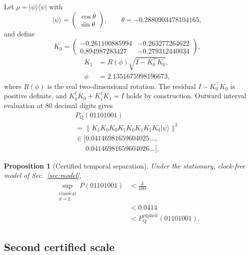 \documentclass[a4paper,twocolumn,11pt,unpublished]{quantumarticle}
\newtheorem{proposition}[theorem]{Proposition}
\begin{document}
Let $\rho=|\psi\rangle\langle\psi|$ with
\begin{equation}
|\psi\rangle=
\begin{pmatrix}\cos\theta\\ \sin\theta\end{pmatrix},
\qquad \theta=-0.2880903478104165,
\end{equation}
and define
\begin{equation}
K_0=
\begin{pmatrix}
-0.261100885994&-0.263277264622\\
 0.894987283427&-0.279312440034
\end{pmatrix},
\end{equation}
\begin{equation}
\begin{aligned}
K_1&=R(\phi)\sqrt{I-K_0^\top K_0},\\
\phi&=2.1351675998196673,
\end{aligned}
\end{equation}
where $R(\phi)$ is the real two-dimensional rotation.  The residual
$I-K_0^\top K_0$ is positive definite, and
$K_0^\dagger K_0+K_1^\dagger K_1=I$ holds by construction.  Outward interval
evaluation at 80 decimal digits gives
\begin{multline}
P_{\mathrm Q}(01101001)\\
=\|K_1K_0K_0K_1K_0K_1K_1K_0|\psi\rangle\|^2\\
\in[0.04146981659604025\ldots,\\
\phantom{\in[}0.04146981659604026\ldots],
\label{eq:quantumvalue}
\end{multline}

\begin{proposition}[Certified temporal separation]
\label{prop:separation}
Under the stationary, clock-free model of Sec.~\ref{sec:model},
\begin{align}
\sup_{\substack{\mathrm{classical}\\d=2}}P(01101001)
&<\frac{3}{100}\nonumber\\
&<0.0414\nonumber\\
&<P_{\mathrm Q}^{\mathrm{explicit}}(01101001).
\end{align}
\end{proposition}

\subsection{Second certified scale}
\end{document}
